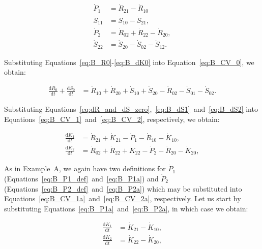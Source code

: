 \begin{align}
\label{eq:B_P1a}
	\dot{P}_{1}												&
	= \dot{R}_{21}
	- \dot{R}_{10}											\\
\label{eq:B_S11}
	\dot{S}_{11}											&
	= \dot{S}_{10}
	- \dot{S}_{21},										\\
\label{eq:B_P2a}
	\dot{P}_{2}												&
	= \dot{R}_{02}
	+ \dot{R}_{22}
	- \dot{R}_{20},										\\
\label{eq:B_S22}
	\dot{S}_{22}											&
	= \dot{S}_{20}
	- \dot{S}_{02} 
	- \dot{S}_{12}.	
\end{align}


Substituting
Equations~\ref{eq:B_R0}-\ref{eq:B_dK0}
into Equation~\ref{eq:B_CV_0}, 
we obtain:

\begin{align} \label{eq:B_CV_0a}
	\frac{\mathrm{d}R_{0}}{\mathrm{d}t} 
	+ \frac{\mathrm{d}S_{0}}{\mathrm{d}t}		& 
	= \dot{R}_{10} + \dot{R}_{20} 
	+ \dot{S}_{10} + \dot{S}_{20} 
	- \dot{R}_{02} 
	- \dot{S}_{01}
	- \dot{S}_{02}.
\end{align}

Substituting Equations~\ref{eq:dR_and_dS_zero},~\ref{eq:B_dS1}~and~\ref{eq:B_dS2}
into Equations~\ref{eq:B_CV_1}~and~\ref{eq:B_CV_2},
respectively,
we obtain:

\begin{align} 
\label{eq:B_CV_1a}
	 \frac{\mathrm{d}K_{1}}{\mathrm{d}t}	&
	=  \dot{R}_{21}
	+ \dot{K}_{21}
	- \dot{P}_{1} 
	- \dot{R}_{10} 
	- \dot{K}_{10},							\\
\label{eq:B_CV_2a}
	\frac{\mathrm{d}K_{2}}{\mathrm{d}t}	&
	=  \dot{R}_{02} 
	+ \dot{R}_{22} 
	+ \dot{K}_{22}
	- \dot{P}_{2}
	- \dot{R}_{20} 
	- \dot{K}_{20},
\end{align}


As in Example~A,
we again have two definitions for $\dot{P}_{1}$
(Equations~\ref{eq:B_P1_def}~and~\ref{eq:B_P1a})
and $\dot{P}_{2}$ 
(Equations~\ref{eq:B_P2_def}~and~\ref{eq:B_P2a})
which may be substituted into
Equations~\ref{eq:B_CV_1a}~and~\ref{eq:B_CV_2a},
respectively. 
Let us start by substituting Equations~\ref{eq:B_P1a}~and~\ref{eq:B_P2a},
in which case we obtain:

\begin{align} 
\label{eq:B_CV_1b}
	 \frac{\mathrm{d}K_{1}}{\mathrm{d}t}	&
	= \dot{K}_{21}
	- \dot{K}_{10},							\\
\label{eq:B_CV_2b}
	\frac{\mathrm{d}K_{2}}{\mathrm{d}t}	&
	=  \dot{K}_{22}
	- \dot{K}_{20},
\end{align}

